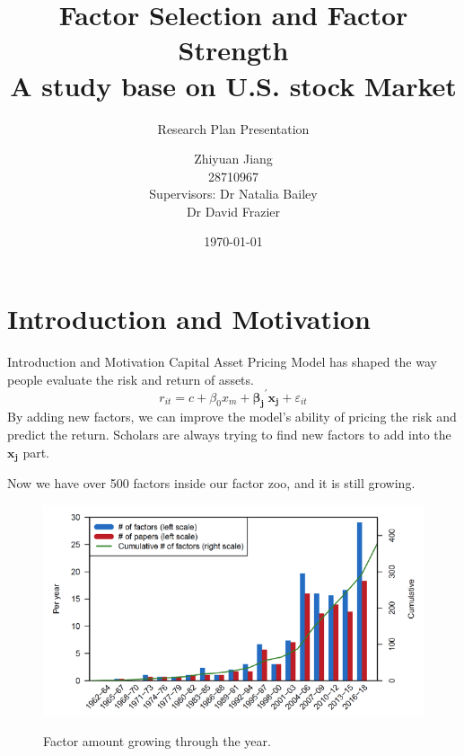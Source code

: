 \documentclass[12pt]{beamer}
\title{Factor Selection and Factor Strength\\
A study base on U.S. stock Market}
\subtitle{Research Plan Presentation}
\date{\today}
\author[author]{Zhiyuan Jiang\\
			28710967\\[10mm]{\small Supervisors: Dr Natalia Bailey \\ \hspace{18.5mm} Dr David Frazier}}
\begin{document}
	
\frame[plain]{\titlepage}

\section{Introduction and Motivation}
\begin{frame}{Introduction and Motivation}
Capital Asset Pricing Model has shaped the way people evaluate the risk and return of assets.
  \[   r_{it} = c + \beta_0 x_m + \mathbf{\beta_j}^{\prime}\mathbf{x_j} + \varepsilon_{it}  \tag{1}\label{2CAPM} \]
By adding new factors, we can improve the model's ability of pricing the risk and predict the return.
 Scholars are always trying to find new factors to add into the $\mathbf{x_j}$  part.
   
   Now we have over 500 factors inside our factor zoo, and it is still growing. \cite{Harvey2019}
\end{frame}
\begin{frame}[plain]
	\begin{figure}
\includegraphics[scale = 0.5]{figure/factor_growth.png}
\caption{Factor amount growing through the year. }
	\cite{Harvey2017}
	\end{figure}
\end{frame}
\end{document}
